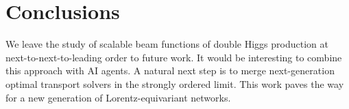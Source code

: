 \section{Conclusions}\label{sec:conclusions}

We leave the study of scalable beam functions of double Higgs production
at next-to-next-to-leading order to future work. It would be interesting
to combine this approach with AI agents. A natural next step is to merge
next-generation optimal transport solvers in the strongly ordered limit.
This work paves the way for a new generation of Lorentz-equivariant
networks.

